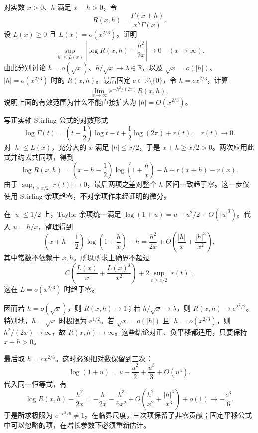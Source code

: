 \begin{exercise}[增长平移的有效尺度]\label{b3:ex:21-8}
对实数 \(x>0\)、\(h\) 满足 \(x+h>0\)，令
\[
 R(x,h)=\frac{\Gamma(x+h)}{x^h\Gamma(x)}.
\]
设 \(L(x)\ge0\) 且 \(L(x)=o(x^{2/3})\)。证明
\[
 \sup_{|h|\le L(x)}
 \left|\log R(x,h)-\frac{h^2}{2x}\right|
 \longrightarrow0\quad(x\to\infty).
\]
由此分别讨论 \(h=o(\sqrt x)\)、\(h/\sqrt x\to\lambda\in\mathbb R\)，以及
\(\sqrt x=o(|h|)\)、\(|h|=o(x^{2/3})\) 时的 \(R(x,h)\)。最后固定 \(c\in\mathbb R\setminus\{0\}\)，令 \(h=cx^{2/3}\)，计算
\[
 \lim_{x\to\infty}e^{-h^2/(2x)}R(x,h),
\]
说明上面的有效范围为什么不能直接扩大为 \(|h|=O(x^{2/3})\)。
\end{exercise}
\begin{solution}
写正实轴 Stirling 公式的对数形式
\[
 \log\Gamma(t)=\left(t-\frac12\right)\log t-t
                 +\frac12\log(2\pi)+r(t),\quad r(t)\to0.
\]
对 \(|h|\le L(x)\)，充分大的 \(x\) 满足 \(|h|\le x/2\)，于是 \(x+h\ge x/2>0\)。两次应用此式并约去共同项，得到
\[
 \log R(x,h)=\left(x+h-\frac12\right)
             \log\left(1+\frac hx\right)-h
             +r(x+h)-r(x).
\]
由于
\(\sup_{t\ge x/2}|r(t)|\to0\)，最后两项之差对整个 \(h\) 区间一致趋于零。这一步仅使用 Stirling 余项趋零，不对余项作未经证明的微分。

在 \(|u|\le1/2\) 上，Taylor 余项统一满足
\(\log(1+u)=u-u^2/2+O(|u|^3)\)。代入 \(u=h/x\)，整理得到
\[
 \left(x+h-\frac12\right)\log\left(1+\frac hx\right)-h
 =\frac{h^2}{2x}
   +O\left(\frac{|h|}x+\frac{|h|^3}{x^2}\right),
\]
其中常数不依赖于 \(x,h\)。所以所求上确界不超过
\[
 C\left(\frac{L(x)}x+\frac{L(x)^3}{x^2}\right)
 +2\sup_{t\ge x/2}|r(t)|,
\]
这在 \(L=o(x^{2/3})\) 时趋于零。

因而若 \(h=o(\sqrt x)\)，则 \(R(x,h)\to1\)；若 \(h/\sqrt x\to\lambda\)，则
\(R(x,h)\to e^{\lambda^2/2}\)。特别地，\(h=\sqrt x\) 时极限为 \(e^{1/2}\)。若
\(\sqrt x=o(|h|)\) 且 \(|h|=o(x^{2/3})\)，则 \(h^2/(2x)\to\infty\)，故 \(R(x,h)\to\infty\)。这些结论对正、负平移都适用，只要保持 \(x+h>0\)。

最后取 \(h=cx^{2/3}\)。这时必须把对数保留到三次：
\[
 \log(1+u)=u-\frac{u^2}2+\frac{u^3}3+O(u^4).
\]
代入同一恒等式，有
\[
 \log R(x,h)-\frac{h^2}{2x}
 =-\frac{h}{2x}-\frac{h^3}{6x^2}
   +O\left(\frac{h^2}{x^2}+\frac{|h|^4}{x^3}\right)+o(1)
 \longrightarrow-\frac{c^3}6.
\]
于是所求极限为 \(e^{-c^3/6}\ne1\)。在临界尺度，三次项保留了非零贡献；固定平移公式中可以忽略的项，在增长参数下必须重新估计。
\end{solution}
